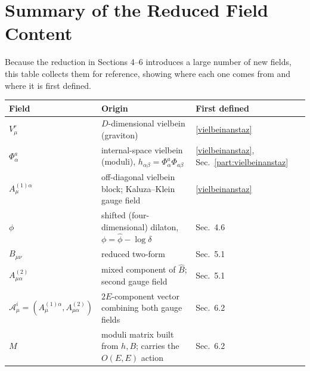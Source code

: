 \documentclass{article}
\begin{document}
\section{Summary of the Reduced Field Content} \label{Fieldsum}
Because the reduction in Sections 4--6 introduces a large number of new fields, this table collects them for reference, showing where each one comes from and where it is first defined.

\begin{center}
\begin{tabular}{@{}lll@{}}
\toprule
Field & Origin & First defined \\
\midrule
$V^r_\mu$ & $D$-dimensional vielbein (graviton) & \eqref{vielbeinanstaz} \\
$\Phi^a_\alpha$ & internal-space vielbein (moduli), $h_{\alpha\beta}=\Phi^a_\alpha\Phi_{a\beta}$ & \eqref{vielbeinanstaz}, Sec.~\ref{part:vielbeinanstaz} \\
$A^{(1)\alpha}_\mu$ & off-diagonal vielbein block; Kaluza--Klein gauge field & \eqref{vielbeinanstaz} \\
$\phi$ & shifted (four-dimensional) dilaton, $\phi=\hat\phi-\log\delta$ & Sec.~4.6 \\
$B_{\mu\nu}$ & reduced two-form & Sec.~5.1 \\
$A^{(2)}_{\mu\alpha}$ & mixed component of $\hat B$; second gauge field & Sec.~5.1 \\
$\mathcal{A}^i_\mu=(A^{(1)\alpha}_\mu, A^{(2)}_{\mu\alpha})$ & $2E$-component vector combining both gauge fields & Sec.~6.2 \\
$M$ & moduli matrix built from $h,B$; carries the $O(E,E)$ action & Sec.~6.2 \\
\bottomrule
\end{tabular}
\end{center}
\end{document}
